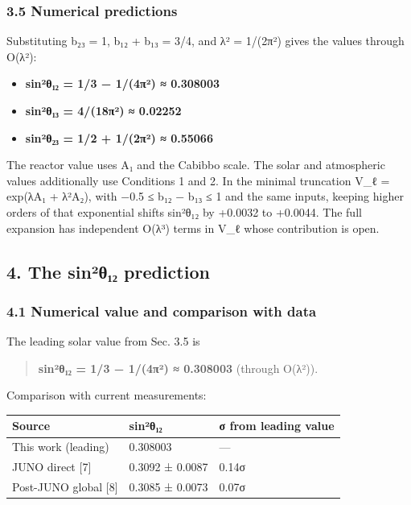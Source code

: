 \documentclass[
]{article}
\providecommand{\tightlist}{%
  \setlength{\itemsep}{0pt}\setlength{\parskip}{0pt}}
\begin{document}
\hypertarget{numerical-predictions}{%
\subsubsection{3.5 Numerical predictions}\label{numerical-predictions}}

Substituting b₂₃ = 1, b₁₂ + b₁₃ = 3/4, and λ² = 1/(2π²) gives the values
through O(λ²):

\begin{itemize}
\tightlist
\item
  \textbf{sin²θ₁₂ = 1/3 − 1/(4π²) ≈ 0.308003}
\item
  \textbf{sin²θ₁₃ = 4/(18π²) ≈ 0.02252}
\item
  \textbf{sin²θ₂₃ = 1/2 + 1/(2π²) ≈ 0.55066}
\end{itemize}

The reactor value uses A₁ and the Cabibbo scale. The solar and
atmospheric values additionally use Conditions 1 and 2. In the minimal
truncation V\_ℓ = exp(λA₁ + λ²A₂), with −0.5 ≤ b₁₂ − b₁₃ ≤ 1 and the
same inputs, keeping higher orders of that exponential shifts sin²θ₁₂ by
+0.0032 to +0.0044. The full expansion has independent O(λ³) terms in
V\_ℓ whose contribution is open.

\hypertarget{the-sinuxb2ux3b8ux2081ux2082-prediction}{%
\subsection{4. The sin²θ₁₂
prediction}\label{the-sinuxb2ux3b8ux2081ux2082-prediction}}

\hypertarget{numerical-value-and-comparison-with-data}{%
\subsubsection{4.1 Numerical value and comparison with
data}\label{numerical-value-and-comparison-with-data}}

The leading solar value from Sec. 3.5 is

\begin{quote}
\textbf{sin²θ₁₂ = 1/3 − 1/(4π²) ≈ 0.308003} (through O(λ²)).
\end{quote}

Comparison with current measurements:

\begin{longtable}[]{@{}lll@{}}
\toprule\noalign{}
Source & sin²θ₁₂ & σ from leading value \\
\midrule\noalign{}
\endhead
\bottomrule\noalign{}
\endlastfoot
This work (leading) & 0.308003 & --- \\
JUNO direct {[}7{]} & 0.3092 ± 0.0087 & 0.14σ \\
Post-JUNO global {[}8{]} & 0.3085 ± 0.0073 & 0.07σ \\
\end{longtable}
\end{document}
